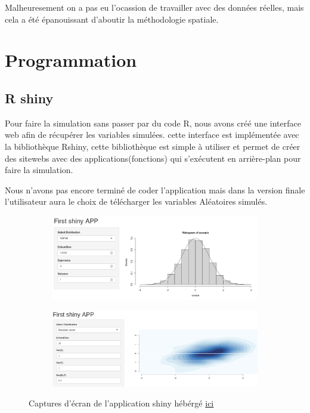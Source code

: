 \documentclass[10pt]{article} %
\begin{document}
Malheuresement on a pas eu l'ocassion de travailler avec des données réelles, mais cela a été épanouissant d'aboutir la méthodologie spatiale.


\section{Programmation}
\subsection{R shiny}

Pour faire la simulation sans passer par du code R, nous avons créé une interface web afin de récupérer les variables simulées.
cette interface est implémentée avec la bibliothèque Rshiny, cette bibliothèque est simple à utiliser et permet de créer des sitewebs
avec des applications(fonctions) qui s'exécutent en arrière-plan pour faire la simulation.

Nous n'avons pas encore terminé de coder l'application mais dans la version finale l'utilisateur aura le choix de télécharger les variables
Aléatoires simulés.

\begin{figure}[h!]
    \centering
    \begin{subfigure}[b]{0.48\textwidth}
        \centering
        \includegraphics[width=\textwidth]{media/apppic1.png}
        \label{gauss plasma}
    \end{subfigure}
    \hfill
    \begin{subfigure}[b]{0.48\textwidth}
        \centering
        \includegraphics[width=\textwidth]{media/rshiny_gauss.png}
        \label{fig:three sin x}
    \end{subfigure}
    \caption{Captures d'écran de l'application shiny hébérgé \href{https://sousmarin.shinyapps.io/shinysousmarin/}{ici}}
\end{figure}
\end{document}
